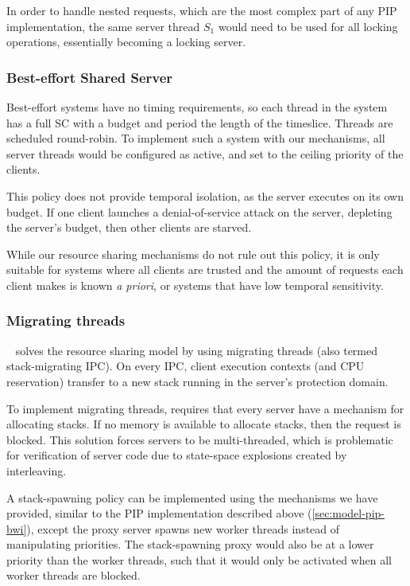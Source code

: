 In order to handle nested requests, which are the most complex part of any \gls{PIP} implementation,
the same server thread $S_{1}$ would need to be used for all locking operations, essentially
becoming a locking server.

\subsubsection{Best-effort Shared Server}
\label{sec:best-effort}

Best-effort systems have no timing requirements, so each thread in the system has a full \gls{SC}
with a budget and period the length of the timeslice. Threads are scheduled round-robin. To
implement such a system with our mechanisms, all server threads would be configured as active, and 
set to the ceiling priority of the clients. 

This policy does not provide temporal isolation, as the server executes on its own budget.  If one
client launches a denial-of-service attack on the server, depleting the server's budget, then other
clients are starved. 

While our resource sharing mechanisms do not rule out this policy, it is only suitable for
systems where all clients are trusted and the amount of requests each client makes is known \emph{a
priori}, or systems that have low temporal sensitivity.

\subsubsection{Migrating threads}

\composite~\citep{Parmer_10} solves the resource sharing model by using migrating 
threads (also termed stack-migrating \gls{IPC}).
On every \gls{IPC}, client execution contexts (and CPU reservation) transfer to a new stack running in the
server's protection domain.

To implement migrating threads, \composite requires that every server have a mechanism for
allocating stacks.  If no memory is available to allocate stacks, then the request is blocked.  This
solution forces servers to be multi-threaded, which is problematic for verification of server code 
due to state-space explosions created by interleaving. 

A stack-spawning policy can be implemented using the mechanisms we have provided, similar to
the \gls{PIP} implementation described above (\cref{sec:model-pip-bwi}), except the proxy
server spawns new worker threads instead of manipulating priorities. 
The stack-spawning proxy would also be at a lower priority than the worker threads, 
such that it would only be activated when all worker threads are blocked.

